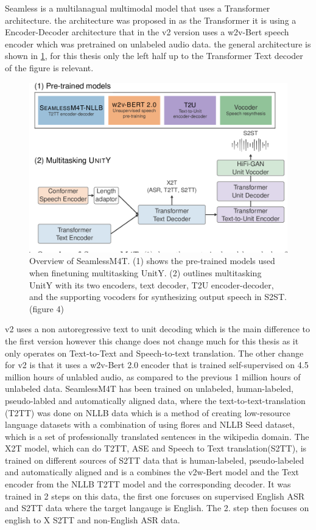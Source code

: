 Seamless is a multilanagual multimodal model that uses a Transformer architecture. 
the architecture was proposed in \cite{seamless2023}
as the Transformer it is using a Encoder-Decoder architecture that in the v2 version uses a w2v-Bert speech encoder which was pretrained on unlabeled audio data. 
the general architecture is shown in \ref{fig:seamlessmodel}, for this thesis only the left half up to the Transformer Text decoder of the figure is relevant. 

\begin{figure}
        \centering
        \includegraphics[width=0.5\linewidth]{Latex//sections/images/seamlessmodel.png}
        \caption{Overview of SeamlessM4T. (1) shows the pre-trained models used when finetuning multitasking UnitY. (2) outlines multitasking UnitY with its two encoders, text decoder, T2U encoder-decoder, and the supporting vocoders for synthesizing output speech in S2ST. \cite{seamless2023}(figure 4)}
        \label{fig:seamlessmodel}
\end{figure}
    
v2 uses a non autoregressive text to unit decoding which is the main difference to the first version however this change does not change much for this thesis as it only operates on Text-to-Text and Speech-to-text translation. 
The other change for v2 is that it uses a w2v-Bert 2.0 \cite{chung2021w2vbertcombiningcontrastivelearning} encoder that is trained self-supervised on 4.5 million hours of unlabled audio, as compared to the previous 1 million hours of unlabeled data. 
SeamlessM4T has been trained on unlabeled, human-labeled, pseudo-labled and automatically aligned data, where the text-to-text-translation (T2TT) was done on NLLB data \cite{nllbteam2022languageleftbehindscaling}
which is a method of creating low-resource language datasets with a combination of using flores \cite{guzmán2019floresevaluationdatasetslowresource} and NLLB Seed dataset, which is a set of professionally translated sentences in the wikipedia domain. 
The X2T model, which can do T2TT, ASE and Speech to Text translation(S2TT), is trained on different sources of S2TT data that is human-labeled, pseudo-labeled and automatically aligned and is a combines the v2w-Bert model and the Text encoder from the NLLB T2TT model and the corresponding decoder.
It was trained in 2 steps on this data, the first one forcuses on supervised English ASR and S2TT data where the target langauge is English. 
The 2. step then focuses on english to X S2TT and non-English ASR data.


